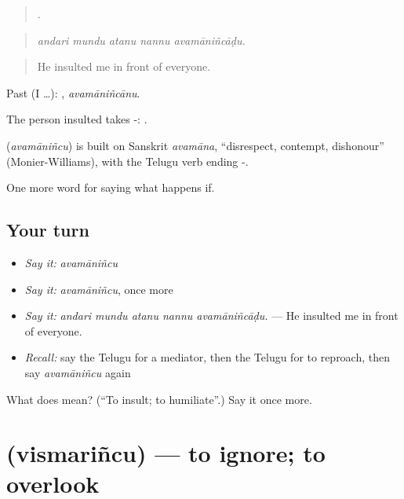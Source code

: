 \begin{quote}
    .
\end{quote}

\begin{quote}
\emph{andari mundu atanu nannu avamāniñcāḍu.}
\end{quote}

\begin{quote}
He insulted me in front of everyone.
\end{quote}

Past (I …): , \emph{avamāniñcānu}.

The person insulted takes -:  .

\begin{cousinweb}
\textbf{} (\emph{avamāniñcu}) is built on Sanskrit \emph{avamāna}, \textquotedblleft{}disrespect, contempt, dishonour\textquotedblright{} (Monier-Williams), with the Telugu verb ending -.
\end{cousinweb}

\begin{grammarlens}[title={What you've built}]
One more word for saying what happens if.
\end{grammarlens}

\subsection*{Your turn}
\begin{itemize}
\raggedright
  \item \emph{Say it:} \emph{avamāniñcu}
  \item \emph{Say it:} \emph{avamāniñcu}, once more
  \item \emph{Say it:} \emph{andari mundu atanu nannu avamāniñcāḍu.} — He insulted me in front of everyone.
  \item \emph{Recall:} say the Telugu for a mediator, then the Telugu for to reproach, then say \emph{avamāniñcu} again
\end{itemize}

\begin{tcolorbox}[breakable,colback=teal!4,colframe=teal!35!black,title={Before you move on}]
What does  mean? (\textquotedblleft{}To insult; to humiliate\textquotedblright{}.) Say it once more.
\end{tcolorbox}
\section[\texorpdfstring{\te{విస్మరించు} (vismariñcu)}{విస్మరించు (vismariñcu)}]{ (vismariñcu) — to ignore; to overlook}

